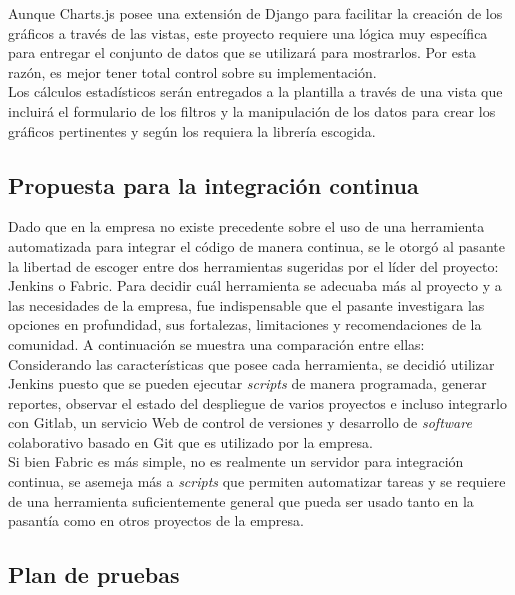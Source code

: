Aunque Charts.js posee una extensión de Django para facilitar la creación de los gráficos a través de las vistas, este proyecto requiere una lógica muy específica para entregar el conjunto de datos que se utilizará para mostrarlos. Por esta razón, es mejor tener total control sobre su implementación. \\

Los cálculos estadísticos serán entregados a la plantilla a través de una vista que incluirá el formulario de los filtros y la manipulación de los datos para crear los gráficos pertinentes y según los requiera la librería escogida.

\subsection{Propuesta para la integración continua}

Dado que en la empresa no existe precedente sobre el uso de una herramienta automatizada para integrar el código de manera continua, se le otorgó al pasante la libertad de escoger entre dos herramientas sugeridas por el líder del proyecto: Jenkins o Fabric. Para decidir cuál herramienta se adecuaba más al proyecto y a las necesidades de la empresa, fue indispensable que el pasante investigara las opciones en profundidad, sus fortalezas, limitaciones y recomendaciones de la comunidad. A continuación se muestra una comparación entre ellas: \\



Considerando las características que posee cada herramienta, se decidió
utilizar Jenkins puesto que se pueden ejecutar \textit{scripts} de manera
programada, generar reportes, observar el estado del despliegue de varios
proyectos e incluso integrarlo con Gitlab, un servicio Web de control de
versiones y desarrollo de \textit{software} colaborativo basado en Git que es
utilizado por la empresa. \\

Si bien Fabric es más simple, no es realmente un servidor para integración
continua, se asemeja más a \textit{scripts} que permiten automatizar tareas y
se requiere de una herramienta suficientemente general que pueda ser usado
tanto en la pasantía como en otros proyectos de la empresa.

\subsection{Plan de pruebas}

